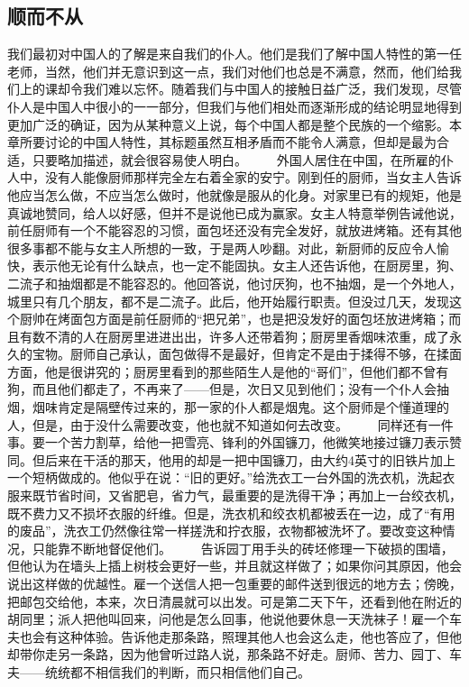 \documentclass[12pt,oneside]{book}
\begin{document}
\begin{common-format}
\chapter{顺而不从}
我们最初对中国人的了解是来自我们的仆人。他们是我们了解中国人特性的第一任老师，当然，他们并无意识到这一点，我们对他们也总是不满意，然而，他们给我们上的课却令我们难以忘怀。随着我们与中国人的接触日益广泛，我们发现，尽管仆人是中国人中很小的一一部分，但我们与他们相处而逐渐形成的结论明显地得到更加广泛的确证，因为从某种意义上说，每个中国人都是整个民族的一个缩影。本章所要讨论的中国人特性，其标题虽然互相矛盾而不能令人满意，但却是最为合适，只要略加描述，就会很容易使人明白。 
　　外国人居住在中国，在所雇的仆人中，没有人能像厨师那样完全左右着全家的安宁。刚到任的厨师，当女主人告诉他应当怎么做，不应当怎么做时，他就像是服从的化身。对家里已有的规矩，他是真诚地赞同，给人以好感，但并不是说他已成为赢家。女主人特意举例告诫他说，前任厨师有一个不能容忍的习惯，面包坯还没有完全发好，就放进烤箱。还有其他很多事都不能与女主人所想的一致，于是两人吵翻。对此，新厨师的反应令人愉快，表示他无论有什么缺点，也一定不能固执。女主人还告诉他，在厨房里，狗、二流子和抽烟都是不能容忍的。他回答说，他讨厌狗，也不抽烟，是一个外地人，城里只有几个朋友，都不是二流子。此后，他开始履行职责。但没过几天，发现这个厨帅在烤面包方面是前任厨师的“把兄弟”，也是把没发好的面包坯放进烤箱；而且有数不清的人在厨房里进进出出，许多人还带着狗；厨房里香烟味浓重，成了永久的宝物。厨师自己承认，面包做得不是最好，但肯定不是由于揉得不够，在揉面方面，他是很讲究的；厨房里看到的那些陌生人是他的“哥们”，但他们都不曾有狗，而且他们都走了，不再来了——但是，次日又见到他们；没有一个仆人会抽烟，烟味肯定是隔壁传过来的，那一家的仆人都是烟鬼。这个厨师是个懂道理的人，但是，由于没什么需要改变，他也就不知道如何去改变。 
　　同样还有一件事。要一个苦力割草，给他一把雪亮、锋利的外国镰刀，他微笑地接过镰刀表示赞同。但后来在干活的那天，他用的却是一把中国镰刀，由大约4英寸的旧铁片加上一个短柄做成的。他似乎在说：“旧的更好。”给洗衣工一台外国的洗衣机，洗起衣服来既节省时间，又省肥皂，省力气，最重要的是洗得干净；再加上一台绞衣机，既不费力又不损坏衣服的纤维。但是，洗衣机和绞衣机都被丢在一边，成了“有用的废品”，洗衣工仍然像往常一样搓洗和拧衣服，衣物都被洗坏了。要改变这种情况，只能靠不断地督促他们。 
　　告诉园丁用手头的砖坯修理一下破损的围墙，但他认为在墙头上插上树枝会更好一些，并且就这样做了；如果你问其原因，他会说出这样做的优越性。雇一个送信人把一包重要的邮件送到很远的地方去；傍晚，把邮包交给他，本来，次日清晨就可以出发。可是第二天下午，还看到他在附近的胡同里；派人把他叫回来，问他是怎么回事，他说他要休息一天洗袜子！雇一个车夫也会有这种体验。告诉他走那条路，照理其他人也会这么走，他也答应了，但他却带你走另一条路，因为他曾听过路人说，那条路不好走。厨师、苦力、园丁、车夫——统统都不相信我们的判断，而只相信他们自己。 

\end{common-format}
\end{document}
